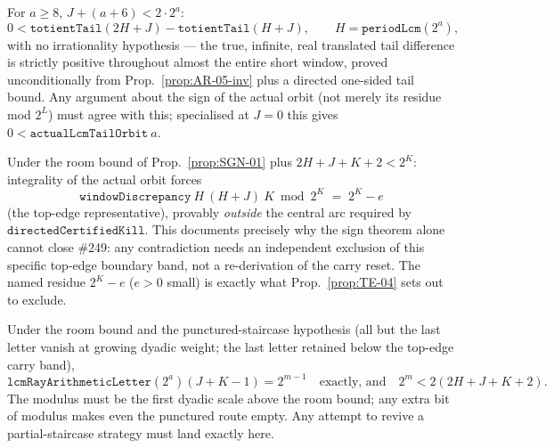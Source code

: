 \begin{prop}\label{prop:SGN-01}
For $a\ge8$, $J+(a+6)<2\cdot2^a$:
\[
0 < \mathtt{totientTail}(2H+J) - \mathtt{totientTail}(H+J),\qquad H=\mathtt{periodLcm}(2^a),
\]
with no irrationality hypothesis — the true, infinite, real translated tail difference is
strictly positive throughout almost the entire short window, proved unconditionally from
Prop.~\ref{prop:AR-05-inv} plus a directed one-sided tail bound. Any argument about the sign of
the actual orbit (not merely its residue mod $2^L$) must agree with this; specialised at $J=0$
this gives $0<\mathtt{actualLcmTailOrbit}\ a$.
\ \ \\
\end{prop}

\begin{prop}\label{prop:SGN-03}
Under the room bound of Prop.~\ref{prop:SGN-01} plus $2H+J+K+2<2^K$: integrality of the actual
orbit forces
\[
\mathtt{windowDiscrepancy}\ H\ (H{+}J)\ K \bmod 2^K \;=\; 2^K - e
\]
(the top-edge representative), provably \emph{outside} the central arc required by
$\mathtt{directedCertifiedKill}$. This documents precisely why the sign theorem alone cannot
close \#249: any contradiction needs an independent exclusion of this specific top-edge boundary
band, not a re-derivation of the carry reset. The named residue $2^K-e$ ($e>0$ small) is exactly
what Prop.~\ref{prop:TE-04} sets out to exclude.
\ \ \\
\end{prop}

\begin{prop}\label{prop:TE-02-inv}
Under the room bound and the punctured-staircase hypothesis (all but the last letter vanish at
growing dyadic weight; the last letter retained below the top-edge carry band),
\[
\mathtt{lcmRayArithmeticLetter}(2^a)(J{+}K{-}1) = 2^{m-1} \quad\text{exactly, and}\quad 2^m < 2(2H+J+K+2).
\]
The modulus must be the first dyadic scale above the room bound; any extra bit of modulus makes
even the punctured route empty. Any attempt to revive a partial-staircase strategy must land
exactly here.
\ \ \\
\end{prop}

